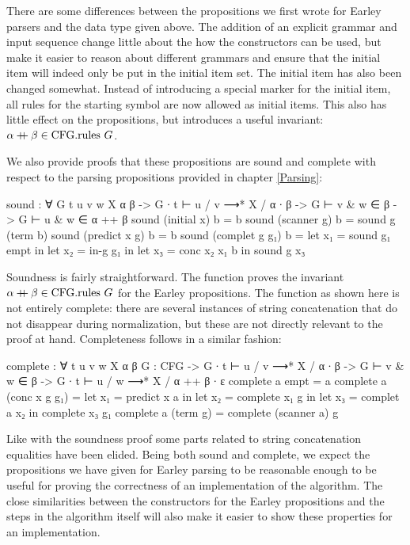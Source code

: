 		There are some differences between the propositions we first wrote for
		Earley parsers and the data type given above. The addition of an
		explicit grammar and input sequence change little about the how the
		constructors can be used, but make it easier to reason about different
		grammars and ensure that the initial item will indeed only be put in
		the initial item set. The initial item has also been changed somewhat.
		Instead of introducing a special marker for the initial item, all rules
		for the starting symbol are now allowed as initial items.  This also
		has little effect on the propositions, but introduces a useful
		invariant: $\alpha \mathbin{{+}\mspace{-8mu}{+}} \beta \in \textrm{CFG.rules } G$.

		We also provide proofs that these propositions are sound and complete
		with respect to the parsing propositions provided in chapter
		\ref{Parsing}:

		\begin{code}
			sound : ∀ {G t u v w X α β} ->
			  G ∙ t ⊢ u / v ⟶* X / α ∙ β ->
			    G ⊢ v & w ∈ β ->
			    G ⊢ u & w ∈ α ++ β
			sound (initial x) b = b
			sound (scanner g) b = sound g (term b)
			sound (predict x g) b = b
			sound (complet g g₁) b =
			  let x₁ = sound g₁ empt in
			  let x₂ = in-g g₁ in
			  let x₃ = conc x₂ x₁ b in
			  sound g x₃
		\end{code}

		Soundness is fairly straightforward. The  function proves
		the invariant $\alpha \mathbin{{+}\mspace{-8mu}{+}} \beta \in \textrm{CFG.rules } G$ for the
		Earley propositions. The function as shown here is not entirely
		complete: there are several instances of string concatenation that do
		not disappear during normalization, but these are not directly relevant
		to the proof at hand. Completeness follows in a similar fashion:

		\begin{code}
			complete : ∀ {t u v w X α β} {G : CFG} ->
			  G ∙ t ⊢ u / v ⟶* X / α ∙ β ->
			  G ⊢ v & w ∈ β ->
			    G ∙ t ⊢ u / w ⟶* X / α ++ β ∙ ε
			complete a empt = a
			complete a (conc x g g₁) =
			  let x₁ = predict x a in
			  let x₂ = complete x₁ g in
			  let x₃ = complet a x₂ in
			  complete x₃ g₁
			complete a (term g) = complete (scanner a) g
		\end{code}

		Like with the soundness proof some parts related to string
		concatenation equalities have been elided. Being both sound and
		complete, we expect the propositions we have given for Earley parsing
		to be reasonable enough to be useful for proving the correctness of an
		implementation of the algorithm. The close similarities between the
		constructors for the Earley propositions and the steps in the algorithm
		itself will also make it easier to show these properties for an
		implementation.

